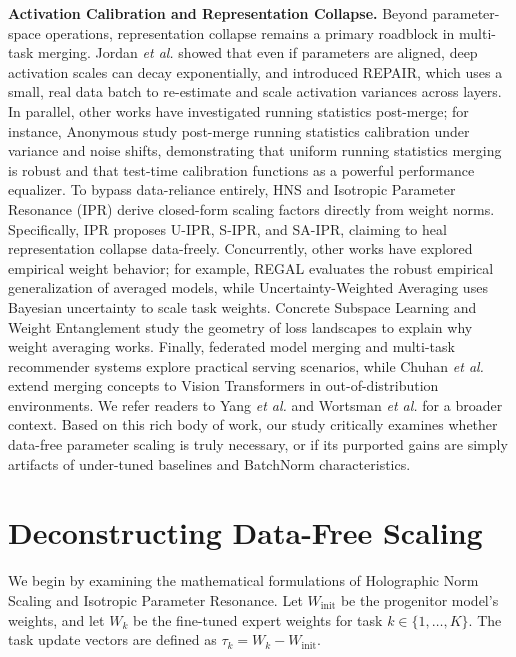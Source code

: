 \documentclass{article}
\newcommand{\etal}{\textit{et al.}}
\begin{document}
\textbf{Activation Calibration and Representation Collapse.} Beyond parameter-space operations, representation collapse remains a primary roadblock in multi-task merging. Jordan \etal \cite{jordan2023repair} showed that even if parameters are aligned, deep activation scales can decay exponentially, and introduced REPAIR, which uses a small, real data batch to re-estimate and scale activation variances across layers. In parallel, other works have investigated running statistics post-merge; for instance, Anonymous \cite{submission3} study post-merge running statistics calibration under variance and noise shifts, demonstrating that uniform running statistics merging is robust and that test-time calibration functions as a powerful performance equalizer. To bypass data-reliance entirely, HNS \cite{submission7} and Isotropic Parameter Resonance (IPR) \cite{submission9} derive closed-form scaling factors directly from weight norms. Specifically, IPR proposes U-IPR, S-IPR, and SA-IPR, claiming to heal representation collapse data-freely. Concurrently, other works have explored empirical weight behavior; for example, REGAL \cite{regal2024} evaluates the robust empirical generalization of averaged models, while Uncertainty-Weighted Averaging \cite{uncertainty2023} uses Bayesian uncertainty to scale task weights. Concrete Subspace Learning \cite{concrete2024} and Weight Entanglement \cite{weightentanglement2024} study the geometry of loss landscapes to explain why weight averaging works. Finally, federated model merging \cite{federatedmerging2023} and multi-task recommender systems \cite{fedorov2022multitask} explore practical serving scenarios, while Chuhan \etal \cite{chuhan2024} extend merging concepts to Vision Transformers in out-of-distribution environments. We refer readers to Yang \etal \cite{yang2024adamerging} and Wortsman \etal \cite{wortsman2022model} for a broader context. Based on this rich body of work, our study critically examines whether data-free parameter scaling is truly necessary, or if its purported gains are simply artifacts of under-tuned baselines and BatchNorm characteristics.

\section{Deconstructing Data-Free Scaling}
\label{sec:deconstruct}

We begin by examining the mathematical formulations of Holographic Norm Scaling and Isotropic Parameter Resonance. Let $W_{\text{init}}$ be the progenitor model's weights, and let $W_k$ be the fine-tuned expert weights for task $k \in \{1, \dots, K\}$. The task update vectors are defined as $\tau_k = W_k - W_{\text{init}}$.
\end{document}
